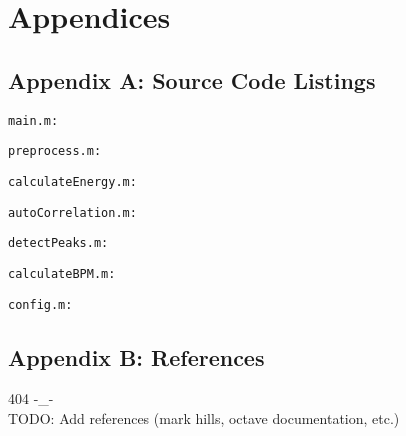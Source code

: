 \section{Appendices}

\subsection{Appendix A: Source Code Listings}

\texttt{main.m:}

\newpage

\texttt{preprocess.m:}

\newpage

\texttt{calculateEnergy.m:}

\newpage

\texttt{autoCorrelation.m:}

\newpage

\texttt{detectPeaks.m:}

\newpage

\texttt{calculateBPM.m:}

\newpage

\texttt{config.m:}


\subsection{Appendix B: References}

404 -\_- \\

TODO: Add references (mark hills, octave documentation, etc.)
